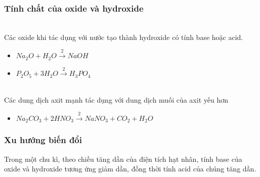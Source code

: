 \subsubsection{Tính chất của oxide và hydroxide}
	\\
	Các oxide khi tác dụng với nước tạo thành hydroxide có tính base hoặc acid.
	\begin{vidu}
		\begin{itemize}
			\item $Na_2O + H_2O \xrightarrow 2NaOH$
			\item $P_2O_5 + 3H_2O \xrightarrow 2H_3PO_4$
		\end{itemize}
	\end{vidu}
	\\
	Các dung dịch axit mạnh tác dụng với dung dịch muối của axit yếu hơn
	\begin{vidu}
		\begin{itemize}
			\item $Na_2CO_3 + 2HNO_3 \xrightarrow 2NaNO_3 + CO_2 + H_2O$
		\end{itemize}
	\end{vidu}
\subsubsection{Xu hướng biến đổi}
	\vspace{0.25 cm}
	\begin{tomtat}
		Trong một chu kì, theo chiều tăng dần của điện tích hạt nhân, tính base của oxide và hydroxide tương ứng giảm dần, đồng thời tính acid của chúng tăng dần.
	\end{tomtat}
	
